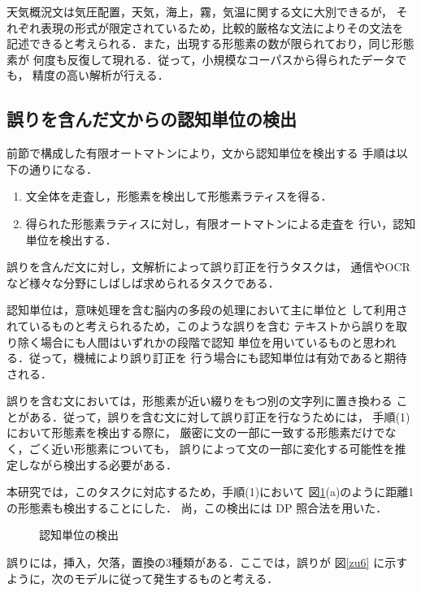 天気概況文は気圧配置，天気，海上，霧，気温に関する文に大別できるが，
それぞれ表現の形式が限定されているため，比較的厳格な文法によりその文法を
記述できると考えられる．また，出現する形態素の数が限られており，同じ形態素が
何度も反復して現れる．従って，小規模なコーパスから得られたデータでも，
精度の高い解析が行える．


\subsection{誤りを含んだ文からの認知単位の検出}

前節で構成した有限オートマトンにより，文から認知単位を検出する
手順は以下の通りになる．

\newtheorem{tejun}{}
\begin{enumerate}
\item 文全体を走査し，形態素を検出して形態素ラティスを得る．
\item 得られた形態素ラティスに対し，有限オートマトンによる走査を
行い，認知単位を検出する．
\end{enumerate}


誤りを含んだ文に対し，文解析によって誤り訂正を行うタスクは，
通信やOCRなど様々な分野にしばしば求められるタスクである．

認知単位は，意味処理を含む脳内の多段の処理において主に単位と
して利用されているものと考えられるため，このような誤りを含む
テキストから誤りを取り除く場合にも人間はいずれかの段階で認知
単位を用いているものと思われる．従って，機械により誤り訂正を
行う場合にも認知単位は有効であると期待される．


誤りを含む文においては，形態素が近い綴りをもつ別の文字列に置き換わる
ことがある．従って，誤りを含む文に対して誤り訂正を行なうためには，
手順(1)において形態素を検出する際に，
厳密に文の一部に一致する形態素だけでなく，ごく近い形態素についても，
誤りによって文の一部に変化する可能性を推定しながら検出する必要がある．

本研究では，このタスクに対応するため，手順(1)において
図\ref{zu4}(a)のように距離1の形態素も検出することにした．
尚，この検出には DP 照合法を用いた\cite{rabi}．

\begin{figure}
\vspace{3mm}
\begin{center}
\end{center}
\caption{認知単位の検出} \label{zu4}
\end{figure}
誤りには，挿入，欠落，置換の3種類がある．ここでは，誤りが
図\ref{zu6} に示すように，次のモデルに従って発生するものと考える．
